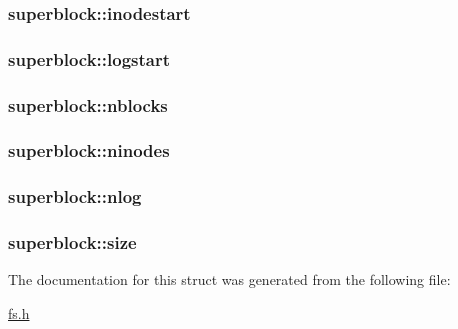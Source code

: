 \subsubsection[{\texorpdfstring{inodestart}{inodestart}}]{ superblock\+::inodestart}\hypertarget{structsuperblock_adde361528f3905445974301b424611c1}{}\label{structsuperblock_adde361528f3905445974301b424611c1}
\subsubsection[{\texorpdfstring{logstart}{logstart}}]{ superblock\+::logstart}\hypertarget{structsuperblock_a460268b28aced19797e8d7b84aa60ebf}{}\label{structsuperblock_a460268b28aced19797e8d7b84aa60ebf}
\subsubsection[{\texorpdfstring{nblocks}{nblocks}}]{ superblock\+::nblocks}\hypertarget{structsuperblock_a2a27a7cfb54689f0e1dcd1788d049218}{}\label{structsuperblock_a2a27a7cfb54689f0e1dcd1788d049218}
\subsubsection[{\texorpdfstring{ninodes}{ninodes}}]{ superblock\+::ninodes}\hypertarget{structsuperblock_a355d2a1ebdc51f80820c23e69363cf42}{}\label{structsuperblock_a355d2a1ebdc51f80820c23e69363cf42}
\subsubsection[{\texorpdfstring{nlog}{nlog}}]{ superblock\+::nlog}\hypertarget{structsuperblock_aea92ae872785fd4fb39b903d9157aac5}{}\label{structsuperblock_aea92ae872785fd4fb39b903d9157aac5}
\subsubsection[{\texorpdfstring{size}{size}}]{ superblock\+::size}\hypertarget{structsuperblock_a7c6e4d6da139ecee74eb7816d5d44fa6}{}\label{structsuperblock_a7c6e4d6da139ecee74eb7816d5d44fa6}


The documentation for this struct was generated from the following file\+:\begin{DoxyCompactItemize}
\item 
\hyperlink{fs_8h}{fs.\+h}\end{DoxyCompactItemize}
